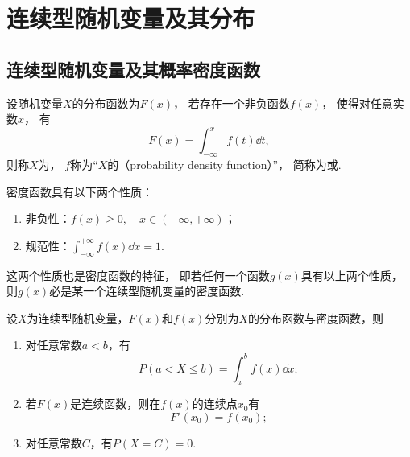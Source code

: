 \section{连续型随机变量及其分布}
\subsection{连续型随机变量及其概率密度函数}
\begin{definition}
设随机变量\(X\)的分布函数为\(F(x)\)，
若存在一个非负函数\(f(x)\)，
使得对任意实数\(x\)，
有\begin{equation*}
	F(x) = \int_{-\infty}^x f(t) \dd{t},
\end{equation*}
则称\(X\)为，
\(f\)称为“\(X\)的（probability density function）”，
简称为或.
\end{definition}

\begin{property}\label{theorem:随机变量及其分布.连续型随机变量的密度函数的性质}
密度函数具有以下两个性质：
\begin{enumerate}
	\item 非负性：\(f(x) \geq 0, \quad x \in (-\infty,+\infty)\)；
	\item 规范性：\(\int_{-\infty}^{+\infty} f(x) \dd{x} = 1\).
\end{enumerate}
\end{property}
这两个性质也是密度函数的特征，
即若任何一个函数\(g(x)\)具有以上两个性质，
则\(g(x)\)必是某一个连续型随机变量的密度函数.

\begin{theorem}
设\(X\)为连续型随机变量，\(F(x)\)和\(f(x)\)分别为\(X\)的分布函数与密度函数，则
\begin{enumerate}
	\item 对任意常数\(a < b\)，有\begin{equation*}
		P(a < X \leq b) = \int_a^b{f(x) \dd{x}};
	\end{equation*}

	\item 若\(F(x)\)是连续函数，则在\(f(x)\)的连续点\(x_0\)有\begin{equation*}
		F'(x_0) = f(x_0);
	\end{equation*}

	\item 对任意常数\(C\)，有\(P(X=C) = 0\).
\end{enumerate}
\end{theorem}

